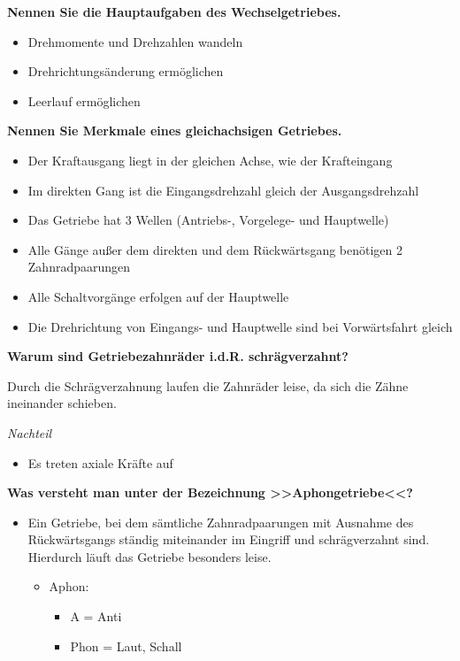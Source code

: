 \textbf{Nennen Sie die Hauptaufgaben des Wechselgetriebes.}

\begin{itemize}
\item
  Drehmomente und Drehzahlen wandeln
\item
  Drehrichtungsänderung ermöglichen
\item
  Leerlauf ermöglichen
\end{itemize}

\textbf{Nennen Sie Merkmale eines gleichachsigen Getriebes.}

\begin{itemize}
\item
  Der Kraftausgang liegt in der gleichen Achse, wie der Krafteingang
\item
  Im direkten Gang ist die Eingangsdrehzahl gleich der Ausgangsdrehzahl
\item
  Das Getriebe hat 3 Wellen (Antriebs-, Vorgelege- und Hauptwelle)
\item
  Alle Gänge außer dem direkten und dem Rückwärtsgang benötigen 2
  Zahnradpaarungen
\item
  Alle Schaltvorgänge erfolgen auf der Hauptwelle
\item
  Die Drehrichtung von Eingangs- und Hauptwelle sind bei Vorwärtsfahrt
  gleich
\end{itemize}

\textbf{Warum sind Getriebezahnräder i.d.R. schrägverzahnt?}

Durch die Schrägverzahnung laufen die Zahnräder leise, da sich die Zähne
ineinander schieben.

\emph{Nachteil}

\begin{itemize}
\item
  Es treten axiale Kräfte auf
\end{itemize}

\textbf{Was versteht man unter der Bezeichnung >>Aphongetriebe<<?}

\begin{itemize}
\item
  Ein Getriebe, bei dem sämtliche Zahnradpaarungen mit Ausnahme des
  Rückwärtsgangs ständig miteinander im Eingriff und schrägverzahnt
  sind. Hierdurch läuft das Getriebe besonders leise.

  \begin{itemize}
  \item
    Aphon:

    \begin{itemize}
    \item
      A = Anti
    \item
      Phon = Laut, Schall
    \end{itemize}
  \end{itemize}
\end{itemize}

